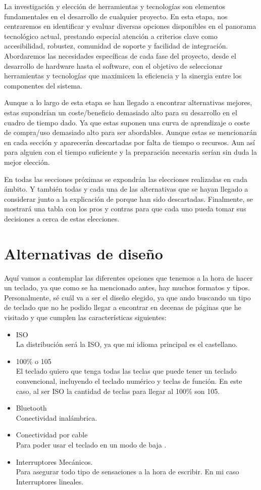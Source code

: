 La investigación y elección de herramientas y tecnologías son elementos fundamentales en el desarrollo de cualquier proyecto. En esta etapa, nos centraremos en identificar y evaluar diversas opciones disponibles en el panorama tecnológico actual, prestando especial atención a criterios clave como accesibilidad, robustez, comunidad de soporte y facilidad de integración. Abordaremos las necesidades específicas de cada fase del proyecto, desde el desarrollo de hardware hasta el software, con el objetivo de seleccionar herramientas y tecnologías que maximicen la eficiencia y la sinergia entre los componentes del sistema.

Aunque a lo largo de esta etapa se han llegado a encontrar alternativas mejores, estas supondrían un coste/beneficio demasiado alto para su desarrollo en el cuadro de tiempo dado.
Ya que estas suponen una curva de aprendizaje o coste de compra/uso demasiado alto para ser abordables. Aunque estas se mencionarán en cada sección y aparecerán descartadas por falta de tiempo o recursos. Aun así para alguien con el tiempo suficiente y la preparación necesaria serían sin duda la mejor elección.

En todas las secciones próximas se expondrán las elecciones realizadas en cada ámbito. Y también todas y cada una de las alternativas que se hayan llegado a considerar junto a la explicación de porque han sido descartadas. Finalmente, se mostrará una tabla con los pros y contras para que cada uno pueda tomar sus decisiones a cerca de estas elecciones.

\section{Alternativas de diseño}
Aquí vamos a contemplar las diferentes opciones que tenemos a la hora de hacer un teclado, ya que como se ha mencionado antes, hay muchos formatos y tipos. Personalmente, sé cuál va a ser el diseño elegido, ya que ando buscando un tipo de teclado que no he podido llegar a encontrar en decenas de páginas  que he visitado y que cumplen las características siguientes:
\begin{itemize}
\item \gls{ISO} \\ La distribución será la \gls{ISO}, ya que mi idioma principal es el castellano.
\item 100\% o 105 \\ El teclado quiero que tenga todas las teclas que puede tener un teclado convencional, incluyendo el teclado numérico y teclas de función. En este caso, al ser \gls{ISO} la cantidad de teclas para llegar al 100\% son 105.
\item \gls{Bluetooth} \\ Conectividad inalámbrica.
\item Conectividad por cable \\ Para poder usar el teclado en un modo de baja .
\item Interruptores Mecánicos. \\ Para asegurar todo tipo de sensaciones a la hora de escribir. En mi caso Interruptores lineales.
\end{itemize}

